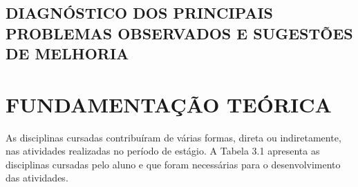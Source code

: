 \documentclass[
  12pt,				%
  openany,
  oneside,
  a4paper,			%
  english,			%
  brazil
]{article}
\numberwithin{figure}{section}
\numberwithin{table}{section}
\begin{document}
\subsection{DIAGNÓSTICO DOS PRINCIPAIS PROBLEMAS OBSERVADOS E SUGESTÕES DE MELHORIA}







\section{FUNDAMENTAÇÃO TEÓRICA}



As disciplinas cursadas contribuíram de várias formas, direta ou indiretamente, nas atividades realizadas no período de estágio. A Tabela 3.1 apresenta as disciplinas cursadas pelo aluno e que foram necessárias para o desenvolvimento das atividades.
\end{document}
